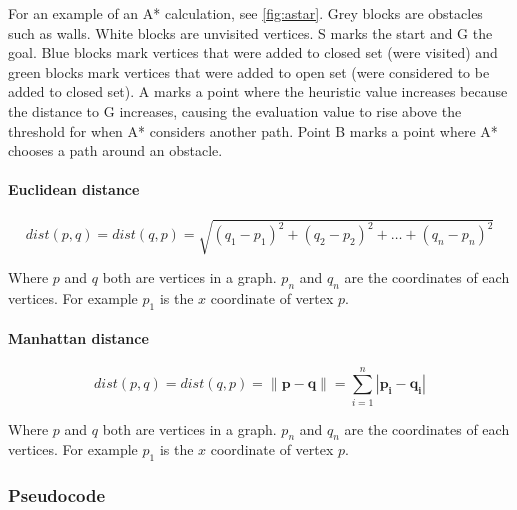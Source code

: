   For an example of an A* calculation, see \cref{fig:astar}. 
  Grey blocks are obstacles such as walls. White blocks are unvisited vertices. S marks the start and G the goal. Blue blocks mark vertices that were added to closed set (were visited) and green blocks mark vertices that were added to open set (were considered to be added to closed set). A marks a point where the heuristic value increases because the distance to G increases, causing the evaluation value to rise above the threshold for when A* considers another path. Point B marks a point where A* chooses a path around an obstacle.

  \paragraph{Euclidean distance}\cite{wiki_euclidean}

  \[
    dist(p, q) = dist(q, p) = \sqrt{(q_{1} - p_{1})^2 + (q_{2} - p_{2})^2 + \dots + (q_{n} - p_{n})^2}
  \]

  Where $p$ and $q$ both are vertices in a graph. $p_{n}$ and $q_{n}$ are the coordinates of each vertices. For example $p_{1}$ is the $x$ coordinate of vertex $p$.

    \paragraph{Manhattan distance}\cite{wiki_manhattan_distance}

  \[
    dist(p, q) = dist(q, p) = \| \mathbf{p} - \mathbf{q} \| = \sum\limits_{i=1}^n | \mathbf{p_{i}} - \mathbf{q_{i}} |
  \]

  Where $p$ and $q$ both are vertices in a graph. $p_{n}$ and $q_{n}$ are the coordinates of each vertices. For example $p_{1}$ is the $x$ coordinate of vertex $p$.



\subsubsection{Pseudocode}

